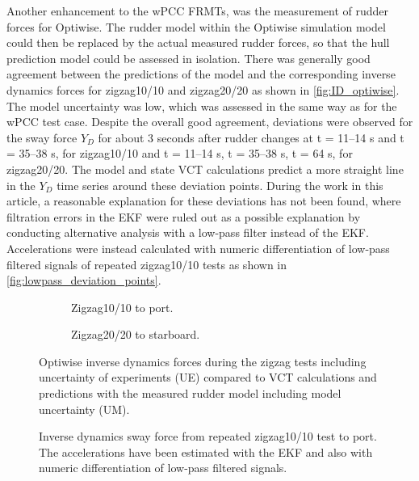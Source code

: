 Another enhancement to the wPCC FRMTs, was the measurement of rudder forces for Optiwise.
The rudder model within the Optiwise simulation model could then be replaced by the actual measured rudder forces, so that the hull prediction model could be assessed in isolation. There was generally good agreement between the predictions of the model and the corresponding inverse dynamics forces for zigzag10/10  and zigzag20/20 as shown in \autoref{fig:ID_optiwise}. The model uncertainty was low, which was assessed in the same way as for the wPCC test case.
Despite the overall good agreement, deviations were observed for the sway force $Y_D$ for about 3 seconds after rudder changes at t = 11--14 s and t = 35--38 s, for zigzag10/10 and t = 11--14 s, t = 35--38 s, t = 64 s, for zigzag20/20. The model and state VCT calculations predict a more straight line in the $Y_D$ time series around these deviation points. 
During the work in this article, a reasonable explanation for these deviations has not been found, where filtration errors in the EKF were ruled out as a possible explanation by conducting alternative analysis with a low-pass filter instead of the EKF. Accelerations were instead calculated with numeric differentiation of low-pass filtered signals of repeated zigzag10/10 tests as shown in \autoref{fig:lowpass_deviation_points}.
\begin{figure}[h]
    \centering
    \begin{subfigure}[b]{\textwidth}
        \centering
        
        \caption{Zigzag10/10 to port.}
        \label{fig:ID_measured_rudder_zigzag_10_10}
    \end{subfigure}
     \vfill
    \begin{subfigure}[b]{\textwidth}
        \centering
        
        \caption{Zigzag20/20 to starboard.}
        \label{fig:ID_measured_rudder_zigzag_20_20}
    \end{subfigure}
    \caption{Optiwise inverse dynamics forces during the zigzag tests including uncertainty of experiments (UE) compared to VCT calculations and predictions with the measured rudder model including model uncertainty (UM).}
    \label{fig:ID_optiwise}
\end{figure}
\begin{figure}[h]
    \centering
    
    \caption{Inverse dynamics sway force from repeated zigzag10/10 test to port. The accelerations have been estimated with the EKF and also with numeric differentiation of low-pass filtered signals.}
    \label{fig:lowpass_deviation_points}
\end{figure}
\FloatBarrier

